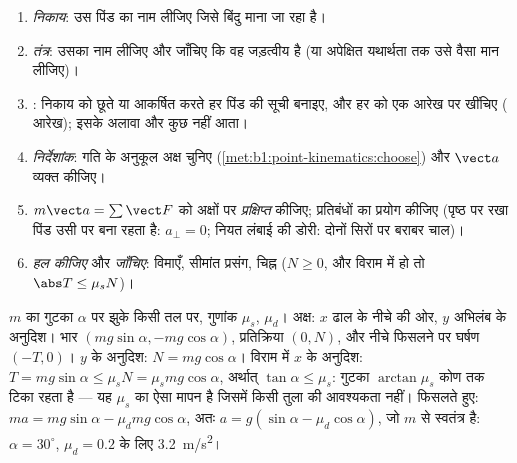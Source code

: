 \begin{method}[स्थिति से समीकरण तक]\label{met:b1:newton-dynamics:method}
\begin{enumerate}
  \item \emph{निकाय}: उस पिंड का नाम लीजिए जिसे बिंदु माना जा रहा है।
  \item \emph{तंत्र}: उसका नाम लीजिए और जाँचिए कि वह जड़त्वीय है (या
        अपेक्षित यथार्थता तक उसे वैसा मान लीजिए)।
  \item \emph{}: निकाय को छूते या आकर्षित करते हर पिंड की सूची बनाइए, और
        हर  को एक आरेख पर खींचिए ( आरेख); इसके अलावा और कुछ नहीं आता।
  \item \emph{निर्देशांक}: गति के अनुकूल अक्ष चुनिए
        (\cref{met:b1:point-kinematics:choose}) और $\vect a$ व्यक्त कीजिए।
  \item $m\vect a = \sum\vect F$ को अक्षों पर \emph{प्रक्षिप्त} कीजिए;
        प्रतिबंधों का प्रयोग कीजिए (पृष्ठ पर रखा पिंड उसी पर बना रहता है:
        $a_\perp = 0$; नियत लंबाई की डोरी: दोनों सिरों पर बराबर चाल)।
  \item \emph{हल कीजिए} और \emph{जाँचिए}: विमाएँ, सीमांत प्रसंग, चिह्न
        ($N \geq 0$, और विराम में हो तो $\abs T \leq \mu_sN$)।
\end{enumerate}
\end{method}

\begin{example}[नत तल पर गुटका]\label{ex:b1:newton-dynamics:incline}
$m$  का गुटका $\alpha$ पर झुके किसी तल पर, गुणांक $\mu_s$,
$\mu_d$। अक्ष: $x$ ढाल के नीचे की ओर, $y$ अभिलंब के अनुदिश। भार
$(mg\sin\alpha, -mg\cos\alpha)$, प्रतिक्रिया $(0, N)$, और नीचे फिसलने पर
घर्षण $(-T, 0)$। $y$ के अनुदिश: $N = mg\cos\alpha$। विराम में $x$ के
अनुदिश: $T = mg\sin\alpha \leq \mu_sN = \mu_smg\cos\alpha$, अर्थात् $\tan\alpha
\leq \mu_s$: गुटका $\arctan\mu_s$ कोण तक टिका रहता है --- यह $\mu_s$ का
ऐसा मापन है जिसमें किसी तुला की आवश्यकता नहीं। फिसलते हुए: $ma = mg\sin\alpha -
\mu_dmg\cos\alpha$, अतः $a = g(\sin\alpha - \mu_d\cos\alpha)$, जो $m$ से
स्वतंत्र है: $\alpha = 30^\circ$, $\mu_d = 0.2$ के लिए \qty{3.2}{m/s^2}।
\end{example}

